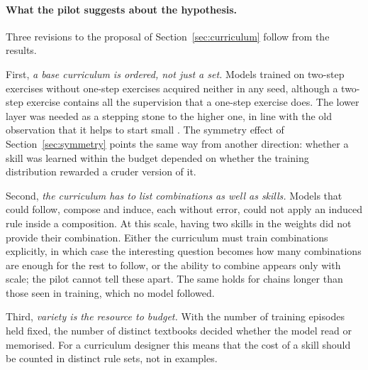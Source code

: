 \paragraph{What the pilot suggests about the hypothesis.}
Three revisions to the proposal of Section~\ref{sec:curriculum} follow from the results.

First, \emph{a base curriculum is ordered, not just a set.}
Models trained on two-step exercises without one-step exercises acquired neither in any seed, although a two-step exercise contains all the supervision that a one-step exercise does.
The lower layer was needed as a stepping stone to the higher one, in line with the old observation that it helps to start small \citep{elman1993starting,bengio2009curriculum}.
The symmetry effect of Section~\ref{sec:symmetry} points the same way from another direction: whether a skill was learned within the budget depended on whether the training distribution rewarded a cruder version of it.

Second, \emph{the curriculum has to list combinations as well as skills.}
Models that could follow, compose and induce, each without error, could not apply an induced rule inside a composition.
At this scale, having two skills in the weights did not provide their combination.
Either the curriculum must train combinations explicitly, in which case the interesting question becomes how many combinations are enough for the rest to follow, or the ability to combine appears only with scale; the pilot cannot tell these apart.
The same holds for chains longer than those seen in training, which no model followed.

Third, \emph{variety is the resource to budget.}
With the number of training episodes held fixed, the number of distinct textbooks decided whether the model read or memorised.
For a curriculum designer this means that the cost of a skill should be counted in distinct rule sets, not in examples.

